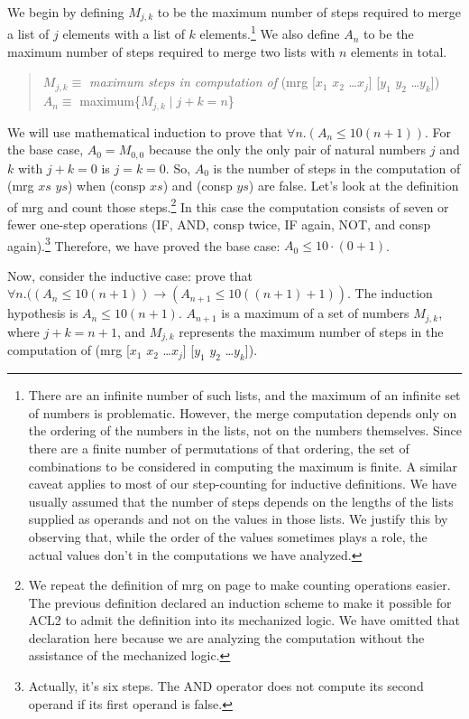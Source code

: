 We begin by defining $M_{j,k}$ to be the maximum number of steps required to merge a list
of $j$ elements with a list of $k$ elements.\footnote{There are an infinite number
of such lists, and the maximum
of an infinite set of numbers is problematic. However, the merge computation
depends only on the ordering of the numbers in the lists, not on the numbers themselves.
Since there are a finite number of permutations of that ordering, the set of
combinations to be considered in computing the maximum is finite.
A similar caveat applies to most of our step-counting for inductive definitions.
We have usually assumed that the number of steps depends on the lengths of the lists
supplied as operands and not on the values in those lists.
We justify this by observing that, while the order of the values sometimes
plays a role, the actual values don't in the computations we have analyzed.}
We also define $A_n$ to be the maximum number of steps required to merge two lists
with $n$ elements in total.
\begin{quote}
$M_{j,k} \equiv$ \emph{maximum steps in computation of} (mrg [$x_1$ $x_2$ \dots $x_j$] [$y_1$ $y_2$ \dots $y_k$]) \\
$A_n \equiv$ maximum\{$M_{j,k} \mid j + k = n$\}
\end{quote}

We will use mathematical induction to prove that $\forall n.(A_n \leq 10(n+1))$.
For the base case, $A_0 = M_{0,0}$ because the only the only pair of natural
numbers $j$ and $k$ with $j + k = 0$ is $j = k = 0$.
So, $A_0$ is the number of steps in the computation of (mrg $xs$ $ys$)
when (consp $xs$) and (consp $ys$) are false.
Let's look at the definition of mrg and count those steps.\footnote{We
repeat the definition of mrg on page \pageref{defun:mrg-copy}
to make counting operations easier.
The previous definition declared an induction scheme to make it
possible for ACL2 to admit the definition into its mechanized logic.
We have omitted that declaration here because we are analyzing
the computation without the assistance of the mechanized logic.}
In this case the computation consists of seven or fewer one-step operations
(IF, AND, consp twice, IF again, NOT, and consp again).\footnote{Actually,
it's six steps. The AND operator does not compute its second operand
if its first operand is false.}
Therefore, we have proved the base case: $A_0 \leq 10\cdot(0 + 1)$.

Now, consider the inductive case:
prove that $\forall n.((A_n \leq 10(n+1)) \rightarrow (A_{n+1} \leq 10((n+1) + 1))$.
The induction hypothesis is $A_n \leq 10(n + 1)$.
$A_{n+1}$ is a maximum of a set of numbers $M_{j,k}$, where $j + k = n+1$,
and $M_{j,k}$ represents the maximum number of steps in the computation of
(mrg [$x_1$ $x_2$ \dots $x_j$] [$y_1$ $y_2$ \dots $y_k$]).

